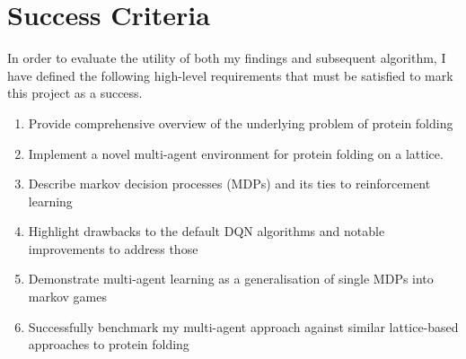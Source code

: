 \section{Success Criteria}
   In order to evaluate the utility of both my findings and subsequent algorithm,
   I have defined the following high-level requirements that must be satisfied to 
   mark this project as a success.
   \begin{enumerate}
      \item Provide comprehensive overview of the underlying problem of protein folding
      \item Implement a novel multi-agent environment for protein folding on a lattice.
      \item Describe markov decision processes (MDPs) and its ties to reinforcement learning
      \item Highlight drawbacks to the default DQN algorithms and notable improvements to address those
      \item Demonstrate multi-agent learning as a generalisation of single MDPs into markov games
      \item Successfully benchmark my multi-agent approach against similar lattice-based approaches to protein folding
   \end{enumerate}

